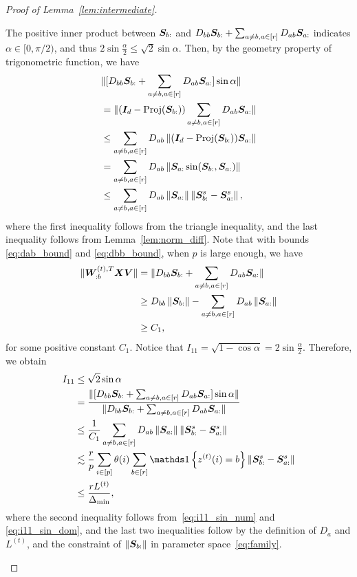\documentclass[journal]{IEEEtran}
\theoremstyle{definition}
\theoremstyle{definition}
\newcommand{\offf}[1]{\left\{#1\right\}}
\begin{document}
\begin{proof}[Proof of Lemma~\ref{lem:intermediate}]
\begin{enumerate}[wide]
    The positive inner product between $\bm S_{b:}$ and $D_{bb} \bm S_{b:} + \sum_{a \neq b, a \in [r]} D_{ab} \bm S_{a:}$ indicates $\alpha \in [0,  \pi/2)$, and thus $2\sin \frac{\alpha}{2} \leq \sqrt{2} \sin \alpha$. Then, by the geometry property of trigonometric function, we have 
    \begin{align}
       &\onormSize{}{ [D_{bb} \mS_{b:} + \sum_{a \neq b, a \in [r]} D_{ab} \mS_{a:}] \sin \alpha} \\
       &= \onormSize{}{(\mI_d - \text{Proj}(\mS_{b:})) \sum_{a \neq b, a \in [r]} D_{ab} \mS_{a:}}\\
       &\leq \sum_{a \neq b, a \in [r]} D_{ab} \onorm{(\mI_d - \text{Proj}(\mS_{b:}))\mS_{a:}  }\\
       &= \sum_{a \neq b, a \in [r]} D_{ab} \onorm{ \mS_{a:} \sin (\mS_{b:}, \mS_{a:}) }\\
       & \leq \sum_{a \neq b, a \in [r]} D_{ab} \onorm{\mS_{a:}} \onorm{ \mS^s_{b:} - \mS^s_{a:}}, \label{eq:i11_sin_num}
    \end{align}
    where the first inequality follows from the triangle inequality, and the last inequality follows from Lemma~\ref{lem:norm_diff}. Note that with bounds \eqref{eq:dab_bound} and \eqref{eq:dbb_bound}, when $p$ is large enough, we have
    \begin{align}
          \onormSize{}{\mW_{:b}^{(t), T} \mX \mV } &= \onormSize{}{ D_{bb} \mS_{b:} + \sum_{a \neq b, a \in [r]} D_{ab} \mS_{a:}} \\
          &\geq D_{bb} \onorm{\mS_{b:}} - \sum_{a \neq b, a \in [r]} D_{ab} \onorm{ \mS_{a:}} \\
          &\geq  C_1,\label{eq:i11_sin_dom}
    \end{align}
    for some positive constant $C_1$. Notice that $I_{11} = \sqrt{1 - \cos \alpha} = 2 \sin \frac{\alpha}{2}$. Therefore, we obtain
    \begin{align}
        I_{11} &\leq \sqrt{2} \sin \alpha \\
        & = \frac{  \onormSize{}{ [D_{bb} \mS_{b:} + \sum_{a \neq b, a \in [r]} D_{ab} \mS_{a:}] \sin \alpha}}{  \onormSize{}{ D_{bb} \mS_{b:} + \sum_{a \neq b, a \in [r]} D_{ab} \mS_{a:}} } \\
        & \leq \frac{ 1}{ C_1}  \sum_{a \neq b, a \in [r]} D_{ab} \onorm{\mS_{a:}} \onorm{ \mS^s_{b:} - \mS^s_{a:}} \\
        & \lesssim \frac{r}{p} \sum_{i \in [p]} \theta(i) \sum_{b \in [r]} \ind\offf{z^{(t)}(i) = b} \onorm{ \mS^s_{b:} - \mS^s_{a:}}\\
        & \leq \frac{r L^{(t)}}{\Delta_{\min}},\label{eq:i11}
    \end{align}
    where the second inequality follows from~\eqref{eq:i11_sin_num} and \eqref{eq:i11_sin_dom}, and the last two inequalities follow by the definition of $D_a$ and $L^{(t)}$, and the constraint of $\left\lVert\bm S_{b:}\right\rVert$ in parameter space~\eqref{eq:family}.
    

\end{enumerate}
\end{proof}
\end{document}

